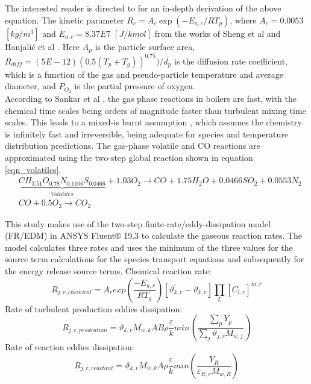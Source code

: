 \documentclass{webofc}
\begin{document}
The interested reader is directed to \cite{ansys} for an in-depth derivation of the above equation. The kinetic parameter $R_{c} = A_{c} \exp(-E_{a,c} / R T_p)$, where $A_c = 0.0053$ $[kg/m^3]$ and $E_{a,c} = 8.37E7$ $[J/kmol]$ from the works of Sheng et al \cite{sheng} and Hanjalić et al \cite{han}. Here $A_p$ is the particle surface area, $R_{diff} = (5E-12)(0.5(T_p+T_g))^{0.75})/\bar{d_p}$ is the diffusion rate coefficient, which is a function of the gas and pseudo-particle temperature and average diameter,  and $P_{O_{2}}$ is the partial pressure of oxygen.\\

According to Sankar et al \cite{sankar}, the gas phase reactions in boilers are fast, with the chemical time scales being orders of magnitude faster than turbulent mixing time scales. This leads to a mixed-is burnt assumption \cite{dibble}, which assumes the chemistry is infinitely fast and irreversible, being adequate for species and temperature distribution predictions. The gas-phase volatile and CO reactions are approximated using the two-step global reaction shown in equation \eqref{eqn_volatiles}. 
\begin{equation}\label{eqn_volatiles}
\begin{split}
&\underbrace{CH_{3.51}O_{0.78}N_{0.1106}S_{0.0466}}_{Volatiles}+1.03O_2\to CO + 1.75H_2O + 0.0466SO_{2} + 0.0553N_2\\
&CO + 0.5O_2\to CO_2
\end{split}
\end{equation}

This study makes use of the two-step finite-rate/eddy-dissipation model (FR/EDM) in ANSYS Fluent® 19.3 \cite{ansys} to calculate the gaseous reaction rates. The model calculates three rates and uses the minimum of the three values for the source term calculations for the species transport equations and subsequently for the energy release source terms.
Chemical reaction rate:
\begin{equation}\label{eqn_rate_chemical}
R_{j,r,chemical}=A_{r}exp\left(\frac{-E_{a,r}}{RT_g}\right)\left[\vartheta^{'}_{k,r}-\vartheta_{k,r}\right]\prod_{L}\left[C_{l,r}\right]^{m,r}
\end{equation}
Rate of turbulent production eddies dissipation:
\begin{equation}\label{eqn_rate_products}
R_{j,r,prodcution}=\vartheta_{k,r}M_{w,k}AB\rho\frac{\varepsilon}{k}min\left(\frac{\sum_{p} Y_p}{\sum_{j}\vartheta_{j,r}M_{w,j}}\right)
\end{equation}
Rate of reaction eddies dissipation:
\begin{equation}\label{eqn_rate_reactants}
R_{j,r,reactant}=\vartheta_{k,r}M_{w,k}A\rho\frac{\varepsilon}{k}min\left(\frac{Y_R}{\varepsilon_{R,r}M_{w,R}}\right)
\end{equation}
\end{document}
